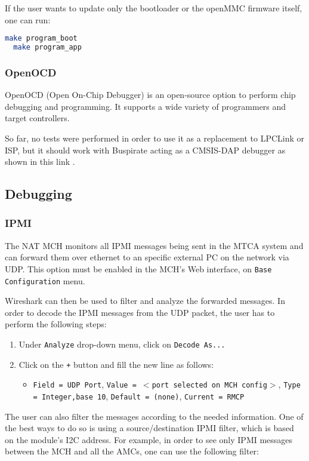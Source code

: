 \documentclass[letterpaper,12pt, titlepage]{article}
\begin{document}
If the user wants to update only the bootloader or the openMMC firmware itself, one can run:

\begin{lstlisting}[language=bash]
  make program_boot
  make program_app
\end{lstlisting}

\subsubsection{OpenOCD}
OpenOCD (Open On-Chip Debugger) is an open-source option to perform chip debugging and programming. It supports a wide variety of programmers and target controllers.

So far, no tests were performed in order to use it as a replacement to LPCLink or ISP, but it should work with Buspirate acting as a CMSIS-DAP debugger as shown in this link \cite{buspirate-debug}.

\subsection{Debugging}

\subsubsection{IPMI}
The NAT MCH monitors all IPMI messages being sent in the MTCA system and can forward them over ethernet to an specific external PC on the network via UDP. This option must be enabled in the MCH's Web interface, on \texttt{Base Configuration} menu.

Wireshark can then be used to filter and analyze the forwarded messages. In order to decode the IPMI messages from the UDP packet, the user has to perform the following steps:

\begin{enumerate}
\item Under \texttt{Analyze} drop-down menu, click on \texttt{Decode As...}
\item Click on the \texttt{+} button and fill the new line as follows:
  \begin{itemize}
  \item \texttt{Field = UDP Port}, \texttt{Value = $<$port selected on MCH config$>$}, \texttt{Type = Integer,base 10}, \texttt{Default = (none)}, \texttt{Current = RMCP}
  \end{itemize}
\end{enumerate}

The user can also filter the messages according to the needed information. One of the best ways to do so is using a source/destination IPMI filter, which is based on the module's I2C address. For example, in order to see only IPMI messages between the MCH and all the AMCs, one can use the following filter:
\end{document}
